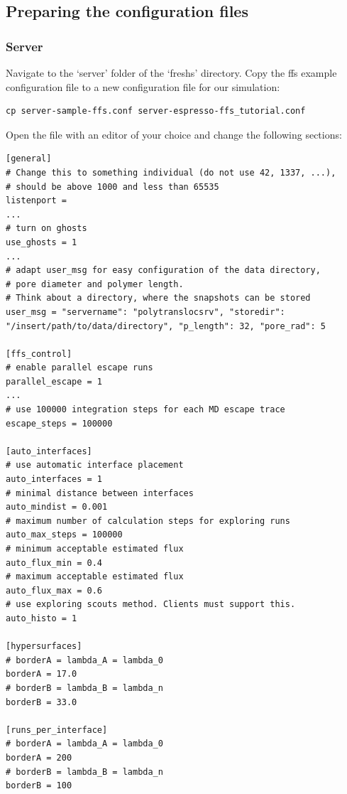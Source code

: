 \documentclass[a4paper,oneside]{article}
\newenvironment{mylisting}
{\begin{list}{}{\setlength{\leftmargin}{1em}}\item\scriptsize\bfseries}
{\end{list}}
\begin{document}
\subsection{Preparing the configuration files}\label{sec:configfiles}
\subsubsection{Server}
Navigate to the `server' folder of the `freshs' directory. Copy the ffs example configuration file to a new configuration file for our simulation:
\begin{mylisting}
\begin{verbatim}
cp server-sample-ffs.conf server-espresso-ffs_tutorial.conf
\end{verbatim}
\end{mylisting}
Open the file with an editor of your choice and change the following sections:
\begin{mylisting}
\begin{verbatim}
[general]
# Change this to something individual (do not use 42, 1337, ...), 
# should be above 1000 and less than 65535
listenport = 
...
# turn on ghosts
use_ghosts = 1
...
# adapt user_msg for easy configuration of the data directory, 
# pore diameter and polymer length.
# Think about a directory, where the snapshots can be stored
user_msg = "servername": "polytranslocsrv", "storedir": 
"/insert/path/to/data/directory", "p_length": 32, "pore_rad": 5

[ffs_control]
# enable parallel escape runs
parallel_escape = 1
...
# use 100000 integration steps for each MD escape trace
escape_steps = 100000

[auto_interfaces]
# use automatic interface placement
auto_interfaces = 1
# minimal distance between interfaces
auto_mindist = 0.001
# maximum number of calculation steps for exploring runs
auto_max_steps = 100000
# minimum acceptable estimated flux
auto_flux_min = 0.4
# maximum acceptable estimated flux
auto_flux_max = 0.6
# use exploring scouts method. Clients must support this.
auto_histo = 1

[hypersurfaces]
# borderA = lambda_A = lambda_0
borderA = 17.0
# borderB = lambda_B = lambda_n
borderB = 33.0

[runs_per_interface]
# borderA = lambda_A = lambda_0
borderA = 200
# borderB = lambda_B = lambda_n
borderB = 100
\end{verbatim}
\end{mylisting}
\end{document}
